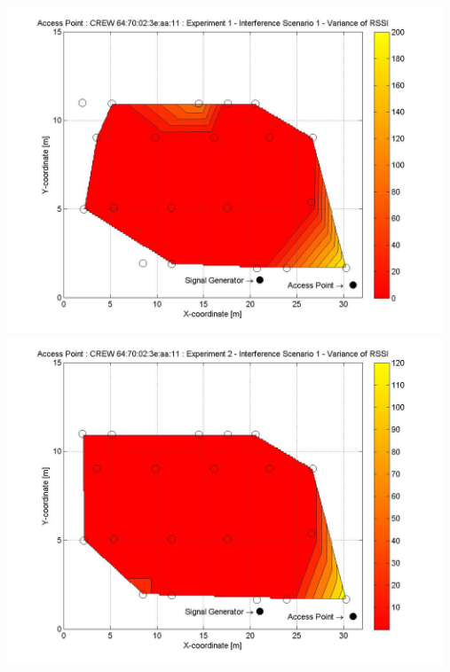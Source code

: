 \documentclass[11pt,a4paper,headinclude,footinclude,chapterprefix=on]{scrreprt}
\begin{document}
\begin{longtable}
	\includegraphics[width=13cm]{../../Source/plot/CREW_11/11_Sig_Ex_1_Variance.jpg} \\
	\includegraphics[width=13cm]{../../Source/plot/CREW_11/11_Sig_Ex_2_Variance.jpg} \\
\end{longtable}
\end{document}
